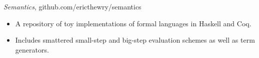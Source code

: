{\sl Semantics}, github.com/ericthewry/semantics
\begin{itemize} \itemsep -2pt
  \item A repository of toy implementations of formal languages in
    Haskell and Coq.
  \item Includes smattered small-step and big-step evaluation schemes
    as well as term generators.
\end{itemize}
